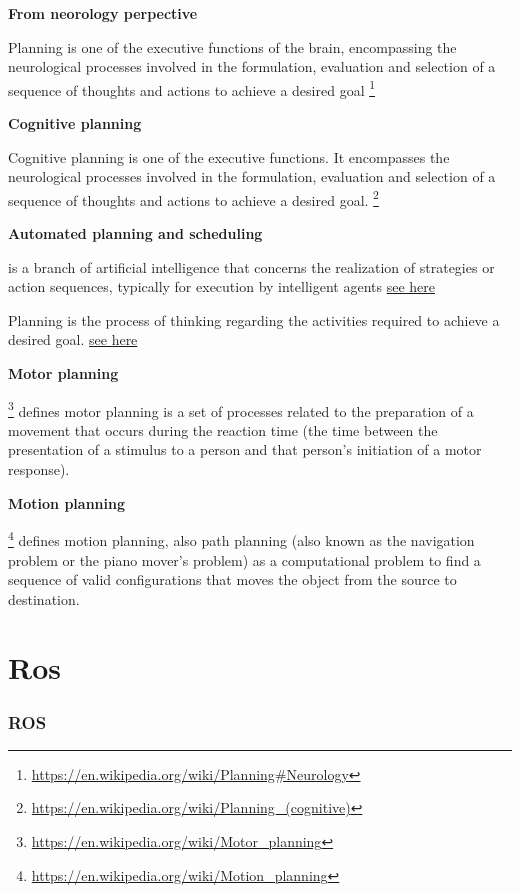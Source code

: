 \documentclass{book}
\newcommand{\seehere}[1]{\href{#1}{see here}}
\providecommand{\ProjectDeepHeading}[2]{%
    \par\medskip\noindent\textbf{#2}\par\smallskip
}
\providecommand{\seehere}[1]{\href{#1}{see here}}
\providecommand{\seeherefooter}[1]{\footnote{\url{#1}}}
\providecommand{\clickurlfooter}[1]{\footnote{\url{#1}}}
\begin{document}
    
    \ProjectDeepHeading{7}{From neorology perpective}
        Planning is one of the executive functions of the brain, encompassing the neurological processes involved in the formulation, evaluation and selection of a sequence of thoughts and actions to achieve a desired goal
        \seeherefooter{https://en.wikipedia.org/wiki/Planning\#Neurology}
    
    
    \ProjectDeepHeading{7}{Cognitive planning}
        
        Cognitive planning is one of the executive functions. It encompasses the neurological processes involved in the formulation, evaluation and selection of a sequence of thoughts and actions to achieve a desired goal.
        \seeherefooter{https://en.wikipedia.org/wiki/Planning_(cognitive)}
    
    
    \ProjectDeepHeading{7}{Automated planning and scheduling}
        is a branch of artificial intelligence that concerns the realization of strategies or action sequences, typically for execution by intelligent agents \seehere{https://en.wikipedia.org/wiki/Automated_planning_and_scheduling}
        
        Planning is the process of thinking regarding the activities required to achieve a desired goal. \seehere{https://en.wikipedia.org/wiki/Planning}
    
    
    \ProjectDeepHeading{7}{Motor planning}
        \clickurlfooter{https://en.wikipedia.org/wiki/Motor_planning} defines motor planning is a set of processes related to the preparation of a movement that occurs during the reaction time (the time between the presentation of a stimulus to a person and that person's initiation of a motor response).
    
    
    \ProjectDeepHeading{7}{Motion planning}
        \clickurlfooter{https://en.wikipedia.org/wiki/Motion_planning} defines motion planning, also path planning (also known as the navigation problem or the piano mover's problem) as a computational problem to find a sequence of valid configurations that moves the object from the source to destination.

\chapter{Ros}


\subsection{ROS}
\end{document}
